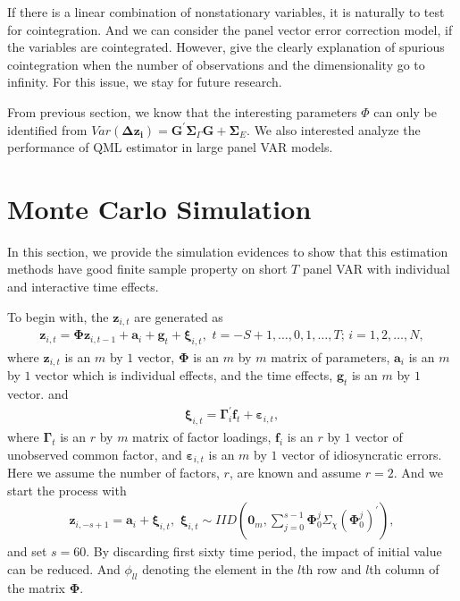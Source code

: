 \documentclass[12pt,a4paper,hyperref]{article}
\begin{document}
If there is a linear combination of nonstationary variables, it is naturally to test for cointegration. And we can consider the panel vector error correction model, if the variables are cointegrated.
However, \citet{Onatski:2018} give the clearly explanation of spurious cointegration when the number of observations and the dimensionality go to infinity.
For this issue, we stay for future research.


From previous section, we know that the interesting parameters $\Phi$ can only be identified from $Var(\boldsymbol{\Delta z_{i}})=\boldsymbol{ G}^{'}\boldsymbol{\Sigma}_{\Gamma}\boldsymbol{G}+\boldsymbol{\Sigma}_{E} $. We also interested analyze the performance of QML estimator in large panel VAR models.



\section{Monte Carlo Simulation}
In this section, we provide the simulation evidences to show that this estimation methods  have good finite sample property on short $T$ panel VAR with individual and interactive time  effects.

To begin with, the $\boldsymbol{z}_{i,t}$ are generated as
\begin{align}
\boldsymbol{z}_{i,t}=\boldsymbol{\Phi} \boldsymbol{z}_{i,t-1}+\boldsymbol{a}_{i}+\boldsymbol{g}_{t}+ \boldsymbol{\xi}_{i,t},\,\, t=-S+1,\ldots, 0,1,\ldots,T; \, i=1,2,\ldots,N,
\end{align}
where $\boldsymbol{z}_{i,t}$ is an $m$ by $1$ vector, $\boldsymbol{\Phi}$ is an $m$ by $m$ matrix of parameters, $\boldsymbol{a}_{i}$ is an $m$ by $1$ vector which is individual effects, and the time effects, $\boldsymbol{g}_{t}$ is an $m$ by $1$ vector.
and
\begin{align}
\boldsymbol{\xi}_{i,t}=\boldsymbol{\Gamma}^{'}_{i}\boldsymbol{f}_{t}+\boldsymbol{\varepsilon}_{i,t},
\end{align}
where  $\boldsymbol{\Gamma}_{t}$ is an $r$ by $m$ matrix of factor loadings, $\boldsymbol{f}_{i}$ is  an $r$ by $1$ vector of unobserved common factor, and $\boldsymbol{\varepsilon}_{i,t}$ is an $m$ by $1$ vector of idiosyncratic errors.
Here we assume the number of factors, $r$, are known and assume $r=2$.
And we start the process with
\begin{align}
\boldsymbol{z}_{i,-s+1}=\boldsymbol{a}_{i}+\boldsymbol{\xi}_{i,t},\,\, \boldsymbol{\xi}_{i,t}\sim IID \left(\boldsymbol{0}_{m}, \sum^{s-1}_{j=0}\boldsymbol{\Phi}^{j}_{0}\Sigma_{\chi}(\boldsymbol{\Phi}^{j}_{0})^{'}  \right),
\end{align}
and set $s=60$. By discarding first sixty time period, the impact of initial value can be reduced. And $\phi_{ll}$ denoting the element in the $l$th row and $l$th column of the matrix $\boldsymbol{\Phi}.$
\end{document}

